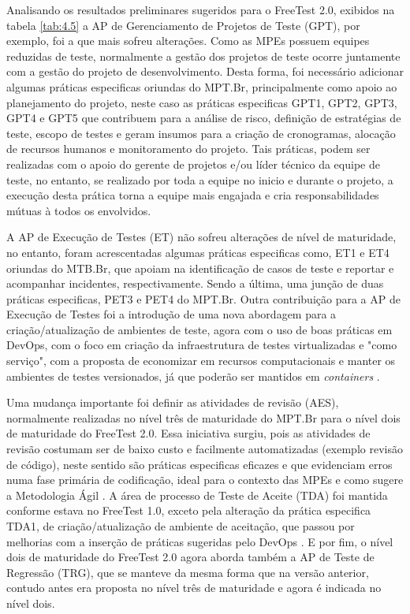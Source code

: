 Analisando os resultados preliminares sugeridos para o FreeTest 2.0, exibidos na tabela \ref{tab:4.5} a AP de Gerenciamento de Projetos de Teste (GPT), por exemplo, foi a que mais sofreu alterações. Como as MPEs possuem equipes reduzidas de teste, normalmente a gestão dos projetos de teste ocorre juntamente com a gestão do projeto de desenvolvimento. Desta forma, foi necessário adicionar algumas práticas especificas oriundas do MPT.Br, principalmente como apoio ao planejamento do projeto, neste caso as práticas especificas GPT1, GPT2, GPT3, GPT4 e GPT5 que contribuem para a análise de risco, definição de estratégias de teste, escopo de testes e geram insumos para a criação de cronogramas, alocação de recursos humanos e monitoramento do projeto. Tais práticas, podem ser realizadas com o apoio do gerente de projetos e/ou líder técnico da equipe de teste, no entanto, se realizado por toda a equipe no inicio e durante o projeto, a execução desta prática torna a equipe mais engajada e cria responsabilidades mútuas à todos os envolvidos. 

A AP de Execução de Testes (ET) não sofreu alterações de nível de maturidade, no entanto, foram acrescentadas algumas práticas especificas como, ET1 e ET4 oriundas do MTB.Br, que apoiam na identificação de casos de teste e reportar e acompanhar incidentes, respectivamente. Sendo a última, uma junção de duas práticas especificas, PET3 e PET4 do MPT.Br. Outra contribuição para a AP de Execução de Testes foi a introdução de uma nova abordagem para a criação/atualização de ambientes de teste, agora com o uso de boas práticas em DevOps, com o foco em criação da infraestrutura de testes virtualizadas e "como serviço", com a proposta de economizar em recursos computacionais e manter os ambientes de testes versionados, já que poderão ser mantidos em \textit{containers} \cite{BRAGA2015}.

Uma mudança importante foi definir as atividades de revisão (AES), normalmente realizadas no nível três de maturidade do MPT.Br para o nível dois de maturidade do FreeTest 2.0. Essa iniciativa surgiu, pois as atividades de revisão costumam ser de baixo custo e facilmente automatizadas (exemplo revisão de código), neste sentido são práticas especificas eficazes e que evidenciam erros numa fase primária de codificação, ideal para o contexto das MPEs e como sugere a Metodologia Ágil \cite{Beck2001}. A área de processo de Teste de Aceite (TDA) foi mantida conforme estava no FreeTest 1.0, exceto pela alteração da prática especifica TDA1, de criação/atualização de ambiente de aceitação, que passou por melhorias com a inserção de práticas sugeridas pelo DevOps \cite{Howlett}. E por fim, o nível dois de maturidade do FreeTest 2.0 agora aborda também a AP de Teste de Regressão (TRG), que se manteve da mesma forma que na versão anterior, contudo antes era proposta no nível três de maturidade e agora é indicada no nível dois.


